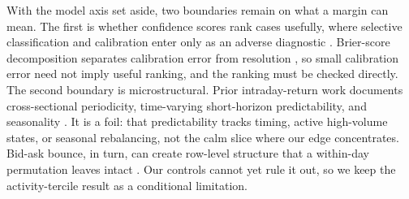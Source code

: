 With the model axis set aside, two boundaries remain on what a margin can mean.
The first is whether confidence scores rank cases usefully, where selective
classification and calibration enter only as an adverse diagnostic
\cite{geifman2017selective,guo2017calibration,traub2024overcoming,chalkidis2021trading}.
Brier-score decomposition separates calibration error from resolution
\cite{brier1950verification,murphy1973vector}, so small calibration error need
not imply useful ranking, and the ranking must be checked directly. The second
boundary is microstructural. Prior intraday-return work documents cross-sectional
periodicity, time-varying short-horizon predictability, and seasonality
\cite{heston2010intraday,henkel2011timevarying,bogousslavsky2016infrequent}. It
is a foil: that predictability tracks timing, active high-volume
states, or seasonal rebalancing, not the calm slice where our edge concentrates.
Bid-ask bounce, in turn, can create row-level structure that a within-day
permutation leaves intact \cite{roll1984simple,lo1990nonsynchronous}. Our
controls cannot yet rule it out, so we keep the activity-tercile result as a
conditional limitation.
